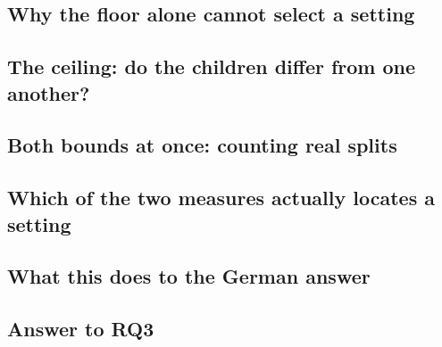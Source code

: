\subsection{Why the floor alone cannot select a setting}
\label{sec:rq3-floorlimit}

\subsection{The ceiling: do the children differ from one another?}
\label{sec:rq3-ceiling}

\subsection{Both bounds at once: counting real splits}
\label{sec:rq3-joint}

\subsection{Which of the two measures actually locates a setting}
\label{sec:rq3-null}

\subsection{What this does to the German answer}
\label{sec:rq3-german}

\subsection{Answer to RQ3}

